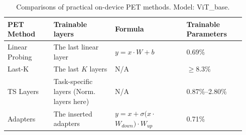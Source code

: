 \begin{table}[!t]
\caption{Comparisons of practical on-device PET methods. Model: ViT\_base.}
\label{table-PET Methods}
\centering
\footnotesize
\setlength{\tabcolsep}{2pt}
\begin{tabular}{@{}L{0.18\linewidth}L{0.24\linewidth}L{0.29\linewidth}L{0.23\linewidth}@{}}
\toprule
\textbf{PET Method} & \textbf{Trainable layers} & \textbf{Formula} & \textbf{Trainable Parameters} \\
\midrule
Linear Probing & The last linear layer & $y=x\cdot W+b$ & 0.69\% \\
\midrule
Last-K & The last $K$ layers & N/A & $\geq$8.3\% \\
\midrule
TS Layers & Task-specific layers (Norm. layers here) & N/A & 0.87\%--2.80\% \\
\midrule
Adapters & The inserted adapters & \mbox{$y=x+\sigma(x\cdot$}\newline\mbox{$W_{down})\cdot W_{up}$} & 0.71\% \\
\bottomrule
\end{tabular}
\end{table}
